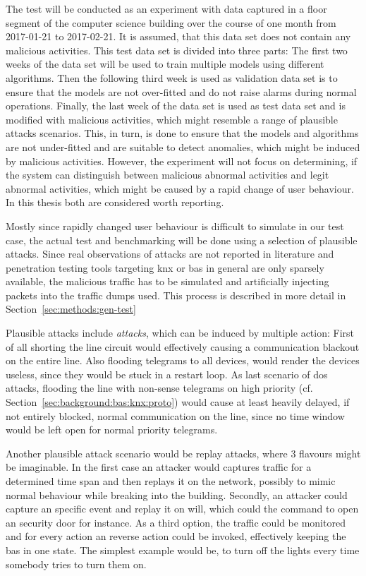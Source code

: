 The test will be conducted as an experiment with data captured in a floor segment of the computer science building over the course of one month from 2017-01-21 to 2017-02-21. It is assumed, that this data set does not contain any malicious activities.
This test data set is divided into three parts:
The first two weeks of the data set will be used to train multiple models using different algorithms.
Then the following third week is used as validation data set is to ensure that the models are not over-fitted and do not raise alarms during normal operations.
Finally, the last week of the data set is used as test data set and is modified with malicious activities, which might resemble a range of plausible attacks scenarios.
This, in turn, is done to ensure that the models and algorithms are not under-fitted and are suitable to detect anomalies, which might be induced by malicious activities.
However, the experiment will not focus on determining, if the system can distinguish between malicious abnormal activities and legit abnormal activities, which might be caused by a rapid change of user behaviour. In this thesis both are considered worth reporting.

Mostly since rapidly changed user behaviour is difficult to simulate in our test case, the actual test and benchmarking will be done using a selection of plausible attacks.
Since real observations of attacks are not reported in literature and penetration testing tools targeting \gls{knx} or \gls{bas} in general are only sparsely available, the malicious traffic has to be simulated and artificially injecting packets into the traffic dumps used. This process is described in more detail in Section~\ref{sec:methods:gen-test}

Plausible attacks include \emph{ attacks}, which can be induced by multiple action: First of all shorting the line circuit would effectively causing a communication blackout on the entire line. Also flooding  telegrams to all devices, would render the devices useless, since they would be stuck in a restart loop. As last scenario of \gls{dos} attacks, flooding the line with non-sense telegrams on high priority (cf. Section~\ref{sec:background:bas:knx:proto}) would cause at least heavily delayed, if not entirely blocked, normal communication on the line, since no time window would be left open for normal priority telegrams.

Another plausible attack scenario would be replay attacks, where 3 flavours might be imaginable.
In the first case an attacker would captures traffic for a determined time span and then replays it on the network, possibly to mimic normal behaviour while breaking into the building.
Secondly, an attacker could capture an specific event and replay it on will, which could the command to open an security door for instance.
As a third option, the traffic could be monitored and for every action an reverse action could be invoked, effectively keeping the \gls{bas} in one state. The simplest example would be, to turn off the lights every time somebody tries to turn them on.

